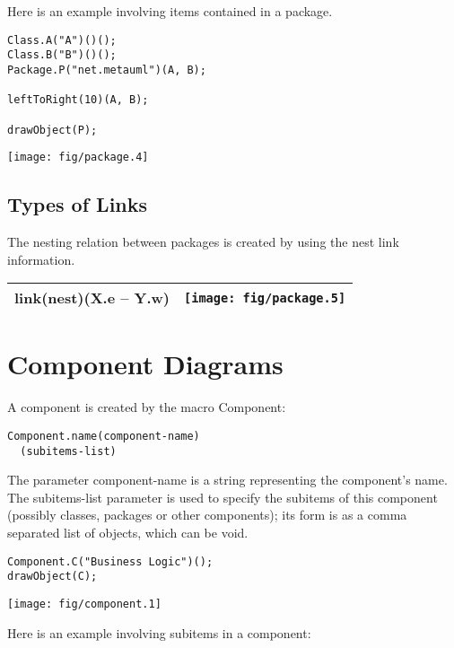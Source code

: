 \documentclass{article}
\newcommand{\code}{\ttfamily}
\begin{document}
Here is an example involving items contained in a package.

\begin{multicols}{2}
\begin{verbatim}
Class.A("A")()();
Class.B("B")()();
Package.P("net.metauml")(A, B);

leftToRight(10)(A, B);

drawObject(P);
\end{verbatim}
\columnbreak
\hspace{3cm}\texttt{[image: fig/package.4]}
\end{multicols}

\subsection{Types of Links}

The nesting relation between packages is created by using the {\code nest} link information.

\begin{tabular}{||l|c||}
\hline
{\code link(nest)(X.e -- Y.w)} & \texttt{[image: fig/package.5]} \\
\hline
\end{tabular}

\section{Component Diagrams}

A component is created by the macro {\code Component}:

\begin{verbatim}
Component.name(component-name)
  (subitems-list)
\end{verbatim}

The parameter {\code component-name} is a string representing the component's name. The {\code subitems-list} parameter is used to specify the subitems of this component (possibly classes, packages or other components); its form is as a comma separated list of objects, which can be void.

\begin{multicols}{2}
\begin{verbatim}
Component.C("Business Logic")();
drawObject(C);
\end{verbatim}
\columnbreak
\hspace{3cm}\texttt{[image: fig/component.1]}
\end{multicols}

Here is an example involving subitems in a component:
\end{document}

